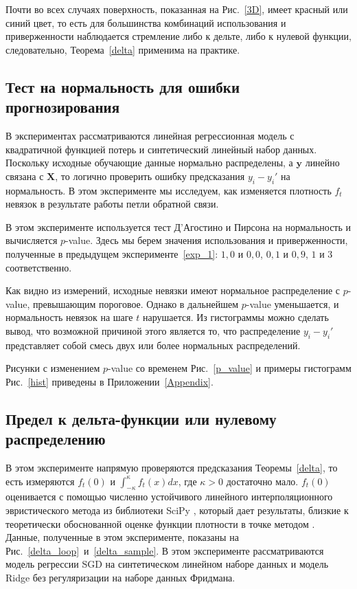     Почти во всех случаях поверхность, показанная на Рис.~\ref{3D}, имеет красный или синий цвет, то есть для большинства комбинаций использования и приверженности наблюдается стремление либо к дельте, либо к нулевой функции, следовательно, Теорема~\ref{delta} применима на практике.

\subsection{Тест на нормальность для ошибки прогнозирования} \label{exp_2}

    В экспериментах рассматриваются линейная регрессионная модель с квадратичной функцией потерь и синтетический линейный набор данных. Поскольку исходные обучающие данные нормально распределены, а $\mathbf{y}$ линейно связана с $\textbf{X}$, то логично проверить ошибку предсказания $y_i - y_i'$ на нормальность. В этом эксперименте мы исследуем, как изменяется плотность $f_t$ невязок в результате работы петли обратной связи.
        
    В этом эксперименте используется тест Д'Агостино и Пирсона на нормальность и вычисляется $p$-value. Здесь мы берем значения использования и приверженности, полученные в предыдущем эксперименте~\ref{exp_1}: $1,0$ и $0,0$, $0,1$ и $0,9$, $1$ и $3$ соответственно. 

    Как видно из измерений, исходные невязки имеют нормальное распределение с $p$-value, превышающим пороговое. Однако в дальнейшем $p$-value уменьшается, и нормальность невязок на шаге $t$ нарушается. 
    Из гистограммы можно сделать вывод, что возможной причиной этого является то, что распределение $y_i - y_i'$ представляет собой смесь двух или более нормальных распределений. 

    Рисунки с изменением $p$-value со временем Рис.~\ref{p_value} и примеры гистограмм Рис.~\ref{hist} приведены в Приложении~\ref{Appendix}.

\subsection{Предел к дельта-функции или нулевому распределению} \label{exp_3}

    В этом эксперименте напрямую проверяются предсказания Теоремы~\ref{delta}, то есть измеряются $f_t(0)$ и $\int_{-\kappa}^{\kappa}f_t(x)dx$, где $\kappa > 0$ достаточно мало. $f_t(0)$ оценивается с помощью численно устойчивого линейного интерполяционного эвристического метода из библиотеки SciPy \citep{virtanen2020SciPy}, который дает результаты, близкие к теоретически обоснованной оценке функции плотности в точке методом \citep{silverman1986density}.
    Данные, полученные в этом эксперименте, показаны на Рис.~\ref{delta_loop}~и~\ref{delta_sample}. В этом эксперименте рассматриваются модель регрессии SGD на синтетическом линейном наборе данных и модель Ridge без регуляризации на наборе данных Фридмана.

